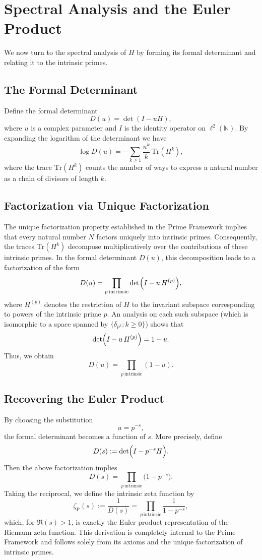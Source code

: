 \documentclass{article}
\begin{document}
\section{Spectral Analysis and the Euler Product}
We now turn to the spectral analysis of \(H\) by forming its formal determinant and relating it to the intrinsic primes.

\subsection{The Formal Determinant}
Define the formal determinant
\[
D(u) = \det(I - u H),
\]
where \(u\) is a complex parameter and \(I\) is the identity operator on \(\ell^2(\mathbb{N})\). By expanding the logarithm of the determinant we have
\[
\log D(u) = -\sum_{k\ge1} \frac{u^k}{k} \, \mathrm{Tr}(H^k),
\]
where the trace \(\mathrm{Tr}(H^k)\) counts the number of ways to express a natural number as a chain of divisors of length \(k\).

\subsection{Factorization via Unique Factorization}
The unique factorization property established in the Prime Framework implies that every natural number \(N\) factors uniquely into intrinsic primes. Consequently, the traces \(\mathrm{Tr}(H^k)\) decompose multiplicatively over the contributions of these intrinsic primes. In the formal determinant \(D(u)\), this decomposition leads to a factorization of the form
\[
D(u) = \prod_{p\,\text{intrinsic}} \det\Bigl(I - u\, H^{(p)}\Bigr),
\]
where \(H^{(p)}\) denotes the restriction of \(H\) to the invariant subspace corresponding to powers of the intrinsic prime \(p\). An analysis on each such subspace (which is isomorphic to a space spanned by \(\{\delta_{p^k} : k\ge0\}\)) shows that
\[
\det\Bigl(I - u\, H^{(p)}\Bigr) = 1 - u.
\]
Thus, we obtain
\[
D(u) = \prod_{p\,\text{intrinsic}} (1 - u).
\]

\subsection{Recovering the Euler Product}
By choosing the substitution
\[
u = p^{-s},
\]
the formal determinant becomes a function of \(s\). More precisely, define
\[
D(s) := \det\Bigl(I - p^{-s} H\Bigr).
\]
Then the above factorization implies
\[
D(s) = \prod_{p\,\text{intrinsic}} \bigl(1 - p^{-s}\bigr).
\]
Taking the reciprocal, we define the intrinsic zeta function by
\[
\zeta_{\mathrm{P}}(s) := \frac{1}{D(s)} = \prod_{p\,\text{intrinsic}} \frac{1}{1 - p^{-s}},
\]
which, for \(\Re(s)>1\), is exactly the Euler product representation of the Riemann zeta function. This derivation is completely internal to the Prime Framework and follows solely from its axioms and the unique factorization of intrinsic primes.
\end{document}
